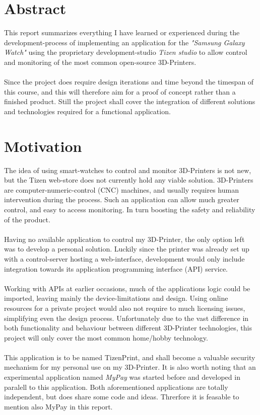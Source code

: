 \documentclass[a4paper, 12pt]{article}
\newcommand{\mysection}[1]{\section*{#1} \addcontentsline{toc}{section}{#1}}
\begin{document}
    

    \tableofcontents

    \newpage


    \mysection{Abstract}
    This report summarizes everything I have learned or experienced during the development-process of implementing
    an application for the \textit{"Samsung Galaxy Watch"} using the proprietary development-studio
    \textit{Tizen studio} to allow control and monitoring of the most common open-source 3D-Printers.
    \\\\
    Since the project does require design iterations and time beyond the timespan of this course, and this will therefore
    aim for a proof of concept rather than a finished product.
    Still the project shall cover the integration of different solutions and technologies required for a functional
    application.

    \mysection{Motivation}
    The idea of using smart-watches to control and monitor 3D-Printers is not new, but the Tizen web-store does not
    currently hold any viable solution.
    3D-Printers are computer-numeric-control (CNC) machines, and usually requires human intervention during the
    process.
    Such an application can allow much greater control, and easy to access monitoring.
    In turn boosting the safety and reliability of the product.
    \\\\
    Having no available application to control my 3D-Printer, the only option left was to develop a personal
    solution.
    Luckily since the printer was already set up with a control-server hosting a web-interface, development would only
    include integration towards its application programming interface (API) service.
    \\\\
    Working with APIs at earlier occasions, much of the applications logic could be imported, leaving mainly the
    device-limitations and design.
    Using online resources for a private project would also not require to much licensing issues, simplifying even the
    design process.
    Unfortunately due to the vast difference in both functionality and behaviour between different 3D-Printer 
    technologies, this project will only cover the most common home/hobby technology.
    \\\\
    This application is to be named TizenPrint, and shall become a valuable security mechanism for my personal use
    on my 3D-Printer.
    It is also worth noting that an experimental application named \textit{MyPay} was started before and developed 
    in paralell to this application.
    Both aforementioned applications are totally independent, but does share some code and ideas.
    Threrfore it is feasable to mention also MyPay in this report.
\end{document}
